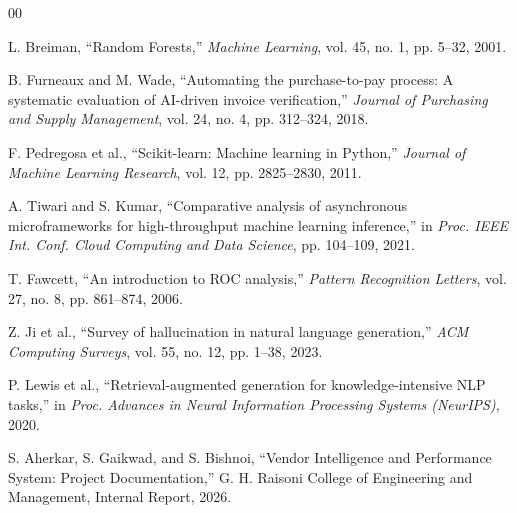 \documentclass[conference]{IEEEtran}
\begin{document}

\begin{thebibliography}{00}

L. Breiman, ``Random Forests,'' \textit{Machine Learning}, vol. 45, no. 1, pp. 5--32, 2001.

B. Furneaux and M. Wade, ``Automating the purchase-to-pay process: A systematic evaluation of AI-driven invoice verification,'' \textit{Journal of Purchasing and Supply Management}, vol. 24, no. 4, pp. 312--324, 2018.

F. Pedregosa et al., ``Scikit-learn: Machine learning in Python,'' \textit{Journal of Machine Learning Research}, vol. 12, pp. 2825--2830, 2011.

A. Tiwari and S. Kumar, ``Comparative analysis of asynchronous microframeworks for high-throughput machine learning inference,'' in \textit{Proc. IEEE Int. Conf. Cloud Computing and Data Science}, pp. 104--109, 2021.

T. Fawcett, ``An introduction to ROC analysis,'' \textit{Pattern Recognition Letters}, vol. 27, no. 8, pp. 861--874, 2006.

Z. Ji et al., ``Survey of hallucination in natural language generation,'' \textit{ACM Computing Surveys}, vol. 55, no. 12, pp. 1--38, 2023.

P. Lewis et al., ``Retrieval-augmented generation for knowledge-intensive NLP tasks,'' in \textit{Proc. Advances in Neural Information Processing Systems (NeurIPS)}, 2020.

S. Aherkar, S. Gaikwad, and S. Bishnoi, ``Vendor Intelligence and Performance System: Project Documentation,'' G. H. Raisoni College of Engineering and Management, Internal Report, 2026.

\end{thebibliography}

\balance
\end{document}
